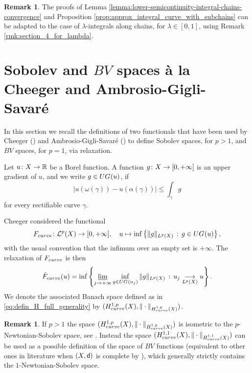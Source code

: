 \documentclass[12pt]{amsart}
\newcommand{\R}{\mathbb{R}}
\newcommand{\sfd}{{\sf d}}
\newcommand{\limi}{\varliminf}
\newcommand{\X}{{\rm X}}
\newcommand{\F}{{\rm F}}
\theoremstyle{definition}
\newtheorem{remark}[theorem]{Remark}
\newcommand{\UG}[1]{{\rm UG}^{#1}}
\newcommand{\calL}[1]{\mathcal{L}^{#1}}
\newcommand{\HH}[2]{H^{1,#1}_{{\rm #2}}}
\renewcommand{\F}[1]{{\rm F}_{{\rm #1}}}
\newcommand{\relF}[1]{\tilde{\rm F}_{{\rm #1}}}
\begin{document}
\begin{remark}
\label{rmk:section_2_for_lambda}
    The proofs of Lemma \ref{lemma:lower-semicontinuity-integral-chains-convergence} and Proposition \ref{prop:approx_integral_curve_with_subchains} can be adapted to the case of $\lambda$-integrals along chains, for $\lambda \in [0,1]$, using Remark \ref{rmk:section_4_for_lambda}.
\end{remark}

\section{Sobolev and $BV$ spaces à la Cheeger and Ambrosio-Gigli-Savaré}
\label{sec:Cheeger-AGS}
%
In this section we recall the definitions of two functionals that have been used by Cheeger (\cite{Cheeger99}) and Ambrosio-Gigli-Savaré (\cite{AmbrosioGigliSavare11-3, AmbrosioGigliSavare14}) to define Sobolev spaces, for $p>1$, and $BV$ spaces, for $p=1$, via relaxation.

Let $u\colon \X \to \R$ be a Borel function. A function $g\colon \X \to [0,+\infty]$ is an upper gradient of $u$, and we write $g\in \UG{}(u)$, if 
\begin{equation}
    \label{eq:defin_UG_curves}
    \vert u(\omega(\gamma)) - u(\alpha(\gamma))\vert \le \int_\gamma g
\end{equation}
for every rectifiable curve $\gamma$.

Cheeger considered the functional
\begin{equation}
    \label{eq:defin_F_Cheeger}
    \F{curve}\colon \calL{p}(\X) \to [0,+\infty], \quad u\mapsto \inf \left\{ \Vert g \Vert_{L^p(\X)}\,:\, g\in \UG{}(u) \right\},
\end{equation}
with the usual convention that the infimum over an empty set is $+\infty$. The relaxation of $\F{curve}$ is then
\begin{equation}
    \label{eq:defin_relaxation_curve}
    \relF{curve}(u) = \inf\left\{ \limi_{j\to +\infty}\inf_{g\in \UG{}(u_j)} \Vert g \Vert_{L^p(\X)}\, : \, u_j \underset{L^p(\X)}{\longrightarrow} u\right\}.
\end{equation}
We denote the associated Banach space defined as in \eqref{eq:defin_H_full_generality} by $(\HH{p}{curve}(\X), \Vert \cdot \Vert_{\HH{p}{curve}(\X)})$.

\begin{remark}
    If $p>1$ the space $(\HH{p}{curve}(\X), \Vert \cdot \Vert_{\HH{p}{curve}(\X)})$ is isometric to the $p$-Newtonian-Sobolev space, see \cite[Theorem 4.10]{Shanmu00}. Instead the space $(\HH{1}{curve}(\X), \Vert \cdot \Vert_{\HH{1}{curve}(\X)})$ can be used as a possible definition of the space of $BV$ functions (equivalent to other ones in literature when $(\X,\sfd)$ is complete by \cite{AmbrosioDiMarino14}), which generally strictly contains the $1$-Newtonian-Sobolev space.
\end{remark}
\end{document}
